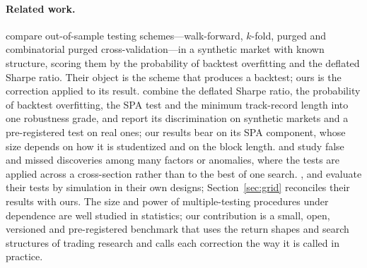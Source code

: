 \paragraph{Related work.}
\citet{arian2024backtest} compare out-of-sample testing schemes---walk-forward, $k$-fold, purged and combinatorial purged cross-validation---in a synthetic market with known structure, scoring them by the probability of backtest overfitting \citep{bailey2017pbo} and the deflated Sharpe ratio. Their object is the scheme that produces a backtest; ours is the correction applied to its result. \citet{santoni2026minerva} combine the deflated Sharpe ratio, the probability of backtest overfitting, the SPA test and the minimum track-record length into one robustness grade, and report its discrimination on synthetic markets and a pre-registered test on real ones; our results bear on its SPA component, whose size depends on how it is studentized and on the block length. \citet{harvey2020false} and \citet{chordia2020anomalies} study false and missed discoveries among many factors or anomalies, where the tests are applied across a cross-section rather than to the best of one search. \citet{hansen2005spa}, \citet{romano2005stepwise} and \citet{hsu2010stepwise} evaluate their tests by simulation in their own designs; Section~\ref{sec:grid} reconciles their results with ours. The size and power of multiple-testing procedures under dependence are well studied in statistics; our contribution is a small, open, versioned and pre-registered benchmark that uses the return shapes and search structures of trading research and calls each correction the way it is called in practice.
